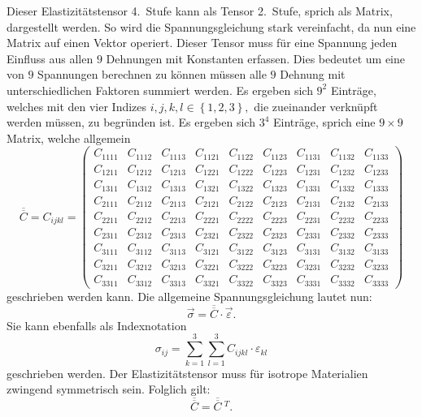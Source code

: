 Dieser Elastizitätstensor 4.~Stufe kann als Tensor 2.~Stufe, sprich als Matrix, dargestellt werden.
So wird die Spannungsgleichung stark vereinfacht, da nun eine Matrix auf einen Vektor operiert.
Dieser Tensor muss für eine Spannung jeden Einfluss aus allen $9$ Dehnungen mit Konstanten erfassen.
Dies bedeutet um eine von $9$ Spannungen berechnen zu können müssen alle $9$ Dehnung mit unterschiedlichen Faktoren summiert werden.
Es ergeben sich $9^2$ Einträge, welches mit den vier Indizes
\(
i, j, k, l\in\left\{1, 2, 3\right\}
,
\)
die zueinander verknüpft werden müssen, zu begründen ist.
Es ergeben sich $3^4$ Einträge, sprich eine $9\times9$ Matrix, welche allgemein
\[
\overline{\overline{C}}
=
C_{i\!jkl}
=
\begin{pmatrix}
C_{1111} & C_{1112} & C_{1113} & C_{1121} & C_{1122} & C_{1123} & C_{1131} & C_{1132} & C_{1133} \\
C_{1211} & C_{1212} & C_{1213} & C_{1221} & C_{1222} & C_{1223} & C_{1231} & C_{1232} & C_{1233} \\
C_{1311} & C_{1312} & C_{1313} & C_{1321} & C_{1322} & C_{1323} & C_{1331} & C_{1332} & C_{1333} \\
C_{2111} & C_{2112} & C_{2113} & C_{2121} & C_{2122} & C_{2123} & C_{2131} & C_{2132} & C_{2133} \\
C_{2211} & C_{2212} & C_{2213} & C_{2221} & C_{2222} & C_{2223} & C_{2231} & C_{2232} & C_{2233} \\
C_{2311} & C_{2312} & C_{2313} & C_{2321} & C_{2322} & C_{2323} & C_{2331} & C_{2332} & C_{2333} \\
C_{3111} & C_{3112} & C_{3113} & C_{3121} & C_{3122} & C_{3123} & C_{3131} & C_{3132} & C_{3133} \\
C_{3211} & C_{3212} & C_{3213} & C_{3221} & C_{3222} & C_{3223} & C_{3231} & C_{3232} & C_{3233} \\
C_{3311} & C_{3312} & C_{3313} & C_{3321} & C_{3322} & C_{3323} & C_{3331} & C_{3332} & C_{3333}
\end{pmatrix}
\]
geschrieben werden kann.
Die allgemeine Spannungsgleichung lautet nun:
\[
\vec\sigma
=
\overline{\overline{C}}\cdot\vec{\varepsilon}
.
\]
Sie kann ebenfalls als Indexnotation
\[
\sigma_{i\!j}
=
\sum_{k=1}^3
\sum_{l=1}^3
C_{i\!jkl}\cdot\varepsilon_{kl}
\]
geschrieben werden.
Der Elastizitätstensor muss für isotrope Materialien zwingend symmetrisch sein.
%
Folglich gilt:
\[
\overline{\overline{C}}
=
\overline{\overline{C}}~^{T}
.
\]

